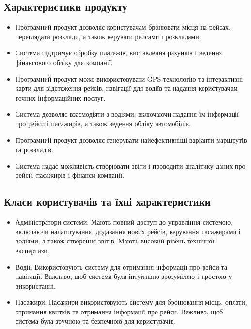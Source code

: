 \documentclass[14pt]{extreport}
\begin{document}
\begin{normalsize}
	\subsection*{Характеристики продукту}
	\begin{itemize}
		\item Програмний продукт дозволяє користувачам бронювати місця на рейсах, переглядати розклади, а також керувати рейсами і розкладами.
		\item Система підтримує обробку платежів, виставлення рахунків і ведення фінансового обліку для компанії.
		\item Програмний продукт може використовувати GPS-технологію та інтерактивні карти для відстеження рейсів, навігації для водіїв та надання користувачам точних інформаційних послуг.
		\item Система дозволяє взаємодіяти з водіями, включаючи надання їм інформації про рейси і пасажирів, а також ведення обліку автомобілів.
		\item Програмний продукт дозволяє генерувати найефективніші варіанти маршрутів та рокзладів.
		\item Система надає можливість створювати звіти і проводити аналітику даних про рейси, пасажирів і фінанси компанії.
	\end{itemize}
	
	\subsection*{Класи користувачів та їхні характеристики}
	\begin{itemize}
		\item Адміністратори системи: Мають повний доступ до управління системою, включаючи налаштування, додавання нових рейсів, керування пасажирами і водіями, а також створення звітів. Мають високий рівень технічної експертизи.
		\item Водії: Використовують систему для отримання інформації про рейси та навігації. Важливо, щоб система була інтуїтивно зрозумілою і простою у використанні.
		\item Пасажири: Пасажири використовують систему для бронювання місць, оплати, отримання квитків та отримання інформації про рейси. Важливо, щоб система була зручною та безпечною для користувачів.
	\end{itemize}
	

\end{normalsize}
\end{document}
